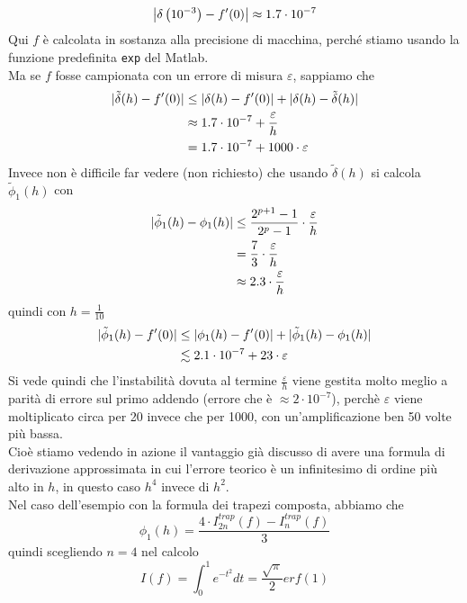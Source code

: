 \[ \abs*{\delta \left(10^{-3}\right) - f'(0)} \approx 1.7 \cdot 10^{-7}\]
Qui $f$ è calcolata in sostanza alla precisione di macchina,
perché stiamo usando la funzione predefinita \texttt{exp} del Matlab.\\
Ma se $f$ fosse campionata con un errore di misura $\varepsilon$, sappiamo che
\[\begin{split}
    \abs{\tilde{\delta}(h) - f'(0)} & \le \abs{\delta(h) - f'(0)} + \abs{\delta(h) - \tilde{\delta}(h)} \\
    & \approx 1.7 \cdot 10^{-7} + \frac{\varepsilon}{h} \\
    & = 1.7 \cdot 10^{-7} + 1000 \cdot \varepsilon
\end{split}\]
Invece non è difficile far vedere (non richiesto) che usando $\tilde{\delta}(h)$ si calcola $\tilde{\phi}_1 (h)$ con
\[\begin{split}
    \abs{\tilde{\phi}_1 (h) - \phi_1(h)} & \le \frac{2^{p+1} - 1}{2^p-1}\cdot \frac{\varepsilon}{h} \\
    & = \frac{7}{3} \cdot \frac{\varepsilon}{h} \\
    & \approx 2.3 \cdot \frac{\varepsilon}{h}
\end{split}\]
quindi con $h=\frac{1}{10}$
\[\begin{split}
    \abs{\tilde{\phi}_1 (h) - f'(0)} & \le \abs{\phi_1(h) - f'(0)} + \abs{\tilde{\phi}_1 (h) - \phi_1(h)} \\
    & \lesssim 2.1 \cdot 10^{-7} + 23 \cdot\varepsilon 
\end{split}\]
Si vede quindi che l'instabilità dovuta al termine $\frac{\varepsilon}{h}$ viene gestita molto meglio a parità di errore sul primo addendo (errore che è $\approx 2 \cdot 10^{-7}$), perchè $\varepsilon$ viene moltiplicato circa per 20 invece che per 1000, con un'amplificazione ben 50 volte più bassa. \\
Cioè stiamo vedendo in azione
il vantaggio già discusso di avere una formula di derivazione approssimata in cui l'errore teorico è un infinitesimo di ordine più alto in $h$, in questo caso $h^4$ invece di $h^2$.\\
Nel caso dell'esempio con la formula dei trapezi composta, abbiamo che
\[\phi_1(h) = \frac{4 \cdot I_{2n}^{trap}(f) - I_n^{trap}(f)}{3}\]
quindi scegliendo $n = 4$ nel calcolo
\[I(f) = \int_0^1 e^{-t^2} dt = \frac{\sqrt{\pi}}{2} erf (1)\]
